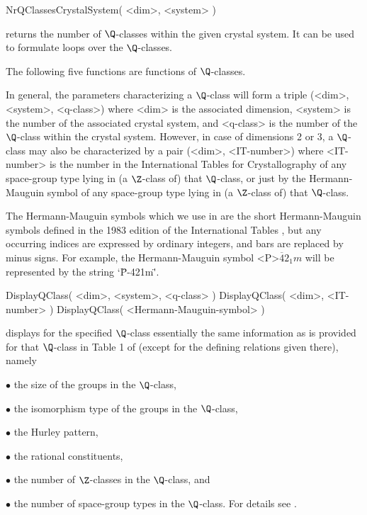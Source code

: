 
\>NrQClassesCrystalSystem( <dim>, <system> )

returns the number of $\Q$-classes within the given crystal system.
It can be used to formulate loops over the $\Q$-classes.

The following five functions are functions of $\Q$-classes.

In general, the parameters characterizing a $\Q$-class will form a
triple (<dim>, <system>, <q-class>) where <dim> is the associated
dimension, <system> is the number of the associated crystal system,
and <q-class> is the number of the $\Q$-class within the crystal
system.  However, in case of dimensions 2 or 3, a $\Q$-class may also
be characterized by a pair (<dim>, <IT-number>) where <IT-number> is
the number in the International Tables for Crystallography
\cite{Hah95} of any space-group type lying in (a $\Z$-class of) that
$\Q$-class, or just by the Hermann-Mauguin symbol of any space-group
type lying in (a $\Z$-class of) that $\Q$-class.

The Hermann-Mauguin symbols  which we
use in {\GAP} are the short Hermann-Mauguin symbols defined in the
1983 edition of the International Tables \cite{Hah95}, but any
occurring indices are expressed by ordinary integers, and bars are
replaced by minus signs.  For example, the Hermann-Mauguin symbol
<P>$\overline{4}2_1m$ will be represented by the string `\"P-421m\"'.

\>DisplayQClass( <dim>, <system>, <q-class> )
\>DisplayQClass( <dim>, <IT-number> )
\>DisplayQClass( <Hermann-Mauguin-symbol> )

displays for the specified $\Q$-class essentially the same information
as is provided for that $\Q$-class in Table 1 of \cite{BBNWZ78}
(except for the defining relations given there), namely
\beginlist%
\item{$\bullet$} the size of the groups in the $\Q$-class,
\item{$\bullet$} the isomorphism type of the groups in the $\Q$-class,
\item{$\bullet$} the Hurley pattern,
\item{$\bullet$} the rational constituents,
\item{$\bullet$} the number of $\Z$-classes in the $\Q$-class, and
\item{$\bullet$} the number of space-group types in the $\Q$-class.
\endlist
For details see \cite{BBNWZ78}.

